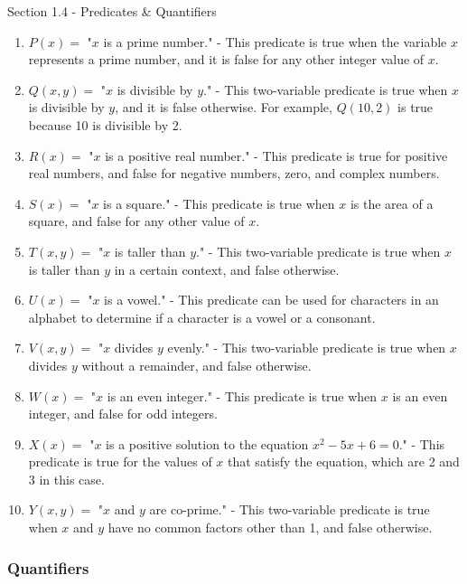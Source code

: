 \begin{notes}{Section 1.4 - Predicates \& Quantifiers}
\begin{highlight}
        \begin{enumerate}
            \item \(P(x) =\) "\(x\) is a prime number." - This predicate is true when the variable \(x\) represents a prime number, and it is false for any other integer value of \(x\).
            \item \(Q(x, y) =\) "\(x\) is divisible by \(y\)." - This two-variable predicate is true when \(x\) is divisible by \(y\), and it is false otherwise. For example, \(Q(10, 2)\) is true because 10 is divisible by 2.
            \item \(R(x) =\) "\(x\) is a positive real number." - This predicate is true for positive real numbers, and false for negative numbers, zero, and complex numbers.
            \item \(S(x) =\) "\(x\) is a square." - This predicate is true when \(x\) is the area of a square, and false for any other value of \(x\).
            \item \(T(x, y) =\) "\(x\) is taller than \(y\)." - This two-variable predicate is true when \(x\) is taller than \(y\) in a certain context, and false otherwise.
            \item \(U(x) =\) "\(x\) is a vowel." - This predicate can be used for characters in an alphabet to determine if a character is a vowel or a consonant.
            \item \(V(x, y) =\) "\(x\) divides \(y\) evenly." - This two-variable predicate is true when \(x\) divides \(y\) without a remainder, and false otherwise.
            \item \(W(x) =\) "\(x\) is an even integer." - This predicate is true when \(x\) is an even integer, and false for odd integers.
            \item \(X(x) =\) "\(x\) is a positive solution to the equation \(x^2 - 5x + 6 = 0\)." - This predicate is true for the values of \(x\) that satisfy the equation, which are 2 and 3 in this case.
            \item \(Y(x, y) =\) "\(x\) and \(y\) are co-prime." - This two-variable predicate is true when \(x\) and \(y\) have no common factors other than 1, and false otherwise.
        \end{enumerate}
    \end{highlight}

    \subsubsection*{Quantifiers}


\end{notes}
